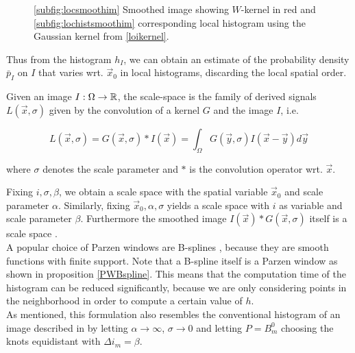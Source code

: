 \begin{figure}
  \centering
  \quad
  \caption{\ref{subfig:locsmoothim} Smoothed image showing $W$-kernel in red and \ref{subfig:lochistsmoothim} corresponding local histogram using the Gaussian kernel from \eqref{loikernel}.}\label{fig:LocHistSmoothRandIm}
\end{figure}

Thus from the histogram $h_I$, we can obtain an estimate of the probability density $\bar{p}_I$ on $I$ that varies wrt. $\vec{x}_0$ in local histograms, discarding the local spatial order.\\

\begin{definition}\label{scalespace}
Given an image $I:\Omega\to \mathbb R$, the scale-space is the family of derived signals $L(\vec{x},\sigma)$ given by the convolution of a kernel $G$ and the image $I$, i.e.

\begin{equation}
L(\vec{x},\sigma) = G(\vec{x},\sigma)*I(\vec{x}) = \int_{\Omega} G(\vec{y},\sigma)I(\vec{x}-\vec{y})d\vec{y}
\end{equation}

where $\sigma$ denotes the scale parameter and $*$ is the convolution operator wrt. $\vec{x}$.
\end{definition}

Fixing $i,\sigma,\beta$, we obtain a scale space with the spatial variable $\vec{x}_0$ and scale parameter $\alpha$. Similarly, fixing $\vec{x}_0,\alpha,\sigma$ yields a scale space with $i$ as variable and scale parameter $\beta$. Furthermore the smoothed image $I(\vec{x})*G(\vec{x},\sigma)$ itself is a scale space \cite{dar.12}.\\

A popular choice of Parzen windows are B-splines \cite{the.00}, because they are smooth functions with finite support. Note that a B-spline itself is a Parzen window as shown in proposition \ref{PWBspline}. This means that the computation time of the histogram can be reduced significantly, because we are only considering points in the neighborhood in order to compute a certain value of $h$.\\
As mentioned, this formulation also resembles the conventional histogram of an image described in  by letting $\alpha\to\infty$, $\sigma\to 0$ and letting $P=B_m^0$ choosing the knots equidistant with $\Delta i_m = \beta$.